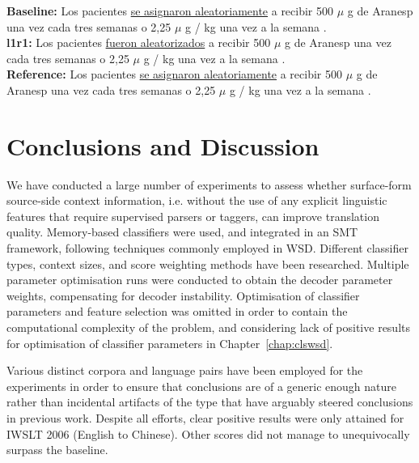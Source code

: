 \begin{exe}
\footnotesize
\ex \textbf{Baseline:} Los pacientes \underline{se asignaron aleatoriamente} a recibir 500 $\mu$ g de Aranesp una vez cada tres semanas o 2,25 $\mu$ g / kg una vez a la semana . \\
\textbf{l1r1:} Los pacientes \underline{fueron aleatorizados} a recibir 500 $\mu$ g de Aranesp una vez cada tres semanas o 2,25 $\mu$ g / kg una vez a la semana . \\
\textbf{Reference:} Los pacientes \underline{se asignaron aleatoriamente} a recibir 500 $\mu$ g de Aranesp una vez cada tres semanas o 2,25 $\mu$ g / kg una vez a la semana .
\label{ex:QAnegative}
\end{exe}


\section{Conclusions and Discussion} 
\label{sec:conclusion}

We have conducted a large number of experiments to assess whether surface-form
source-side context information, i.e. without the use of any explicit
linguistic features that require supervised parsers or taggers, can improve
translation quality. Memory-based classifiers were used, and integrated in an
SMT framework, following techniques commonly employed in WSD. Different
classifier types, context sizes, and score weighting methods have been
researched. Multiple parameter optimisation runs were conducted to obtain the
decoder parameter weights, compensating for decoder instability. Optimisation
of classifier parameters and feature selection was omitted in order to contain
the computational complexity of the problem, and considering lack of positive
results for optimisation of classifier parameters in Chapter~\ref{chap:clswsd}.

Various distinct corpora and language pairs have been employed for the
experiments in order to ensure that conclusions are of a generic enough
nature rather than incidental artifacts of the type that have arguably steered
conclusions in previous work. Despite all efforts, clear positive results were only
attained for IWSLT 2006 (English to Chinese). Other scores did not manage to
unequivocally surpass the baseline.


